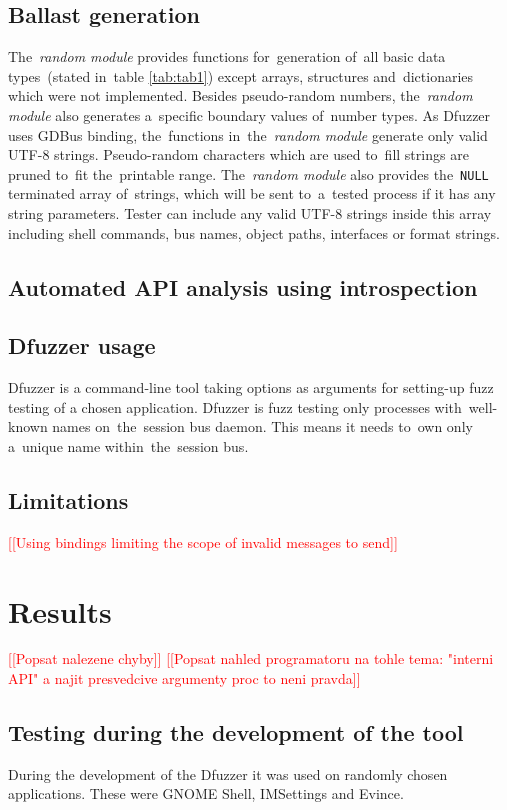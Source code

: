 \documentclass[conference]{IEEEtran}
\newcommand{\addtodo}[1]{\textcolor{red}{[[#1]]}}
\newcommand{\dummytext}{\textcolor{light-gray}{\Blindtext}}
\begin{document}
\subsection{Ballast generation}
The~\emph{random module} provides functions for~generation of~all basic data
types~(stated in~table \ref{tab:tab1}) except arrays, structures and~dictionaries
which were not implemented. Besides pseudo-random numbers, the~\emph{random module} also generates
a~specific boundary values of~number types.
As Dfuzzer uses GDBus binding, the~functions in~the~\emph{random module} generate
only valid UTF-8 strings. Pseudo-random characters which are used to~fill strings
are pruned to~fit the~printable range.
The~\emph{random module} also provides the~\texttt{NULL} terminated array of~strings,
which will be sent to~a~tested process if it has any string parameters. Tester
can include any valid UTF-8 strings inside this array including shell commands,
bus names, object paths, interfaces or format strings.\\

\subsection{Automated API analysis using introspection}
\dummytext
\subsection{Dfuzzer usage}
Dfuzzer is a command-line tool taking options as arguments for setting-up fuzz
testing of a chosen application. Dfuzzer is fuzz testing only processes
with~well-known names on~the~session bus daemon. This means it needs to~own
only a~unique name within~the~session bus.

\dummytext
\subsection{Limitations}
\addtodo{Using bindings limiting the scope of invalid messages to send}

\section{Results}
\addtodo{Popsat nalezene chyby}
\addtodo{Popsat nahled programatoru na tohle tema: "interni API" a najit presvedcive argumenty proc to neni pravda}
\subsection{Testing during the development of the tool}
During the development of the Dfuzzer it was used on randomly chosen applications.
These were GNOME Shell, IMSettings and Evince.
\end{document}

